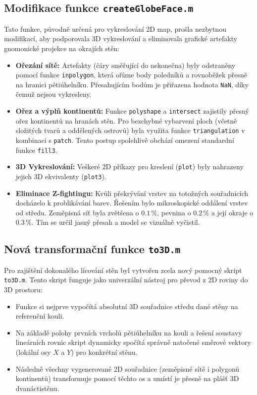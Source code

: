 \documentclass[12pt, a4paper]{article}
\begin{document}
\subsection{Modifikace funkce \texttt{createGlobeFace.m}}
Tato funkce, původně určená pro vykreslování 2D map, prošla nezbytnou modifikací, aby podporovala 3D vykreslování a eliminovala grafické artefakty gnomonické projekce na okrajích stěn:
\begin{itemize}
    \item \textbf{Ořezání sítě:} Artefakty (čáry směřující do nekonečna) byly odstraněny pomocí funkce \texttt{inpolygon}, která ořízne body poledníků a rovnoběžek přesně na hranici pětiúhelníku. Přesahujícím bodům je přiřazena hodnota \texttt{NaN}, díky čemuž nejsou vykresleny.
    \item \textbf{Ořez a výplň kontinentů:} Funkce \texttt{polyshape} a \texttt{intersect} zajistily přesný ořez kontinentů na hranách stěn. Pro bezchybné vybarvení ploch (včetně složitých tvarů a oddělených ostrovů) byla využita funkce \texttt{triangulation} v kombinaci s \texttt{patch}. Tento postup spolehlivě obchází omezení standardní funkce \texttt{fill3}.
    \item \textbf{3D Vykreslování:} Veškeré 2D příkazy pro kreslení (\texttt{plot}) byly nahrazeny jejich 3D ekvivalenty (\texttt{plot3}).
    \item \textbf{Eliminace Z-fightingu:} Kvůli překrývání vrstev na totožných souřadnicích docházelo k problikávání barev. Řešením bylo mikroskopické oddálení vrstev od středu. Zeměpisná síť byla zvětšena o $0.1\,\%$, pevnina o $0.2\,\%$ a její okraje o $0.3\,\%$. Tím se určil jasný přesah a model se vizuálně vyčistil.
\end{itemize}

\subsection{Nová transformační funkce \texttt{to3D.m}}
Pro zajištění dokonalého lícování stěn byl vytvořen zcela nový pomocný skript \texttt{to3D.m}. Tento skript funguje jako univerzální nástroj pro převod z 2D roviny do 3D prostoru:
\begin{itemize}
    \item Funkce si nejprve vypočítá absolutní 3D souřadnice středu dané stěny na referenční kouli.
    \item Na základě polohy prvních vrcholů pětiúhelníku na kouli a řešení soustavy lineárních rovnic skript dynamicky spočítá správně natočené směrové vektory (lokální osy $X$ a $Y$) pro konkrétní stěnu.
    \item Následně všechny vygenerované 2D souřadnice (zeměpisné sítě i polygonů kontinentů) transformuje pomocí těchto os a umístí je přesně na plášť 3D dvanáctistěnu.
\end{itemize}
\end{document}
